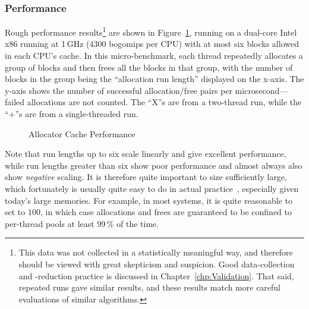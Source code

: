 \QuickQuizEnd

\subsubsection{Performance}

Rough performance results\footnote{
	This data was not collected in a statistically meaningful way,
	and therefore should be viewed with great skepticism and suspicion.
	Good data-collection and -reduction practice is discussed
	in Chapter~\ref{chp:Validation}.
	That said, repeated runs gave similar results, and these results
	match more careful evaluations of similar algorithms.}
are shown in
Figure~\ref{fig:SMPdesign:Allocator Cache Performance},
running on a dual-core Intel x86 running at 1\,GHz (4300 bogomips per CPU)
with at most six blocks allowed in each CPU's cache.
In this micro-benchmark,
each thread repeatedly allocates a group of blocks and then frees all
the blocks in that group, with
the number of blocks in the group being the ``allocation run length''
displayed on the x-axis.
The y-axis shows the number of successful allocation/free pairs per
microsecond---failed allocations are not counted.
The ``X''s are from a two-thread run, while the ``+''s are from a
single-threaded run.

\begin{figure}
\centering
{}
\caption{Allocator Cache Performance}
\label{fig:SMPdesign:Allocator Cache Performance}
\end{figure}

Note that run lengths up to six scale linearly and give excellent performance,
while run lengths greater than six show poor performance and almost always
also show \emph{negative} scaling.
It is therefore quite important to size 
sufficiently large,
which fortunately is usually quite easy to do in actual
practice~\cite{McKenney01e}, especially given today's large memories.
For example, in most systems, it is quite reasonable to set
 to 100, in which case allocations and frees
are guaranteed to be confined to per-thread pools at least 99\,\% of
the time.

